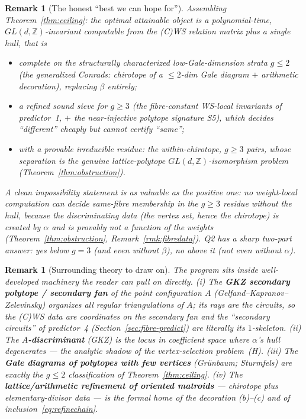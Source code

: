 \documentclass{amsart}
\newtheorem{remark}[theorem]{Remark}
\begin{document}
\begin{remark}[The honest ``best we can hope for'']\label{rmk:ceiling}
Assembling Theorem~\ref{thm:ceiling}: the optimal attainable object is
\emph{a polynomial-time, $GL(d,\mathbb Z)$-invariant computable from the (C)WS
relation matrix plus a single hull, that is}
\begin{itemize}
  \item \emph{complete} on the structurally characterized low-Gale-dimension
        strata $g\le 2$ (the generalized Conrads: chirotope of a $\le2$-dim Gale
        diagram $+$ arithmetic decoration), \emph{replacing $\beta$ entirely};
  \item a \emph{refined sound sieve} for $g\ge3$ (the fibre-constant WS-local
        invariants of predictor~1, $+$ the near-injective polytope signature S5),
        which decides ``different'' cheaply but cannot certify ``same'';
  \item with a \emph{provable irreducible residue}: the within-chirotope,
        $g\ge3$ pairs, whose separation is the genuine lattice-polytope
        $GL(d,\mathbb Z)$-isomorphism problem (Theorem~\ref{thm:obstruction}).
\end{itemize}
A clean impossibility statement is as valuable as the positive one: \emph{no
weight-local computation can decide same-fibre membership in the $g\ge3$ residue
without the hull}, because the discriminating data (the vertex set, hence the
chirotope) is created by $\alpha$ and is provably not a function of the weights
(Theorem~\ref{thm:obstruction}, Remark~\ref{rmk:fibredata}). Q2 has a sharp
two-part answer: \emph{yes} below $g=3$ (and even without $\beta$), \emph{no}
above it (not even without $\alpha$).
\end{remark}

\begin{remark}[Surrounding theory to draw on]\label{rmk:surrounding}
The program sits inside well-developed machinery the reader can pull on directly.
\emph{(i)} The \textbf{GKZ secondary polytope / secondary fan} of the point
configuration $A$ (Gelfand--Kapranov--Zelevinsky) organizes \emph{all} regular
triangulations of $A$; its rays are the circuits, so the (C)WS data are
coordinates on the secondary fan and the ``secondary circuits'' of predictor~4
(Section~\ref{sec:fibre-predict}) are literally its $1$-skeleton. \emph{(ii)} The
\textbf{$A$-discriminant} (GKZ) is the locus in coefficient space where $\alpha$'s
hull degenerates --- the analytic shadow of the vertex-selection problem~(H).
\emph{(iii)} The \textbf{Gale diagrams of polytopes with few vertices}
(Gr\"unbaum; Sturmfels) are exactly the $g\le2$ classification of
Theorem~\ref{thm:ceiling}. \emph{(iv)} The \textbf{lattice/arithmetic refinement
of oriented matroids} --- chirotope plus elementary-divisor data --- is the
formal home of the decoration (b)--(c) and of inclusion~\eqref{eq:refinechain}.
\end{remark}
\end{document}
